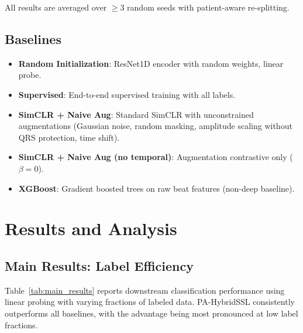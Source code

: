 \documentclass[journal,10pt]{IEEEtran}
\newcommand{\method}{PA-HybridSSL}
\newcommand{\tabref}[1]{Table~\ref{#1}}
\begin{document}
All results are averaged over $\geq$3 random seeds with patient-aware re-splitting.

\subsection{Baselines}

\begin{itemize}
    \item \textbf{Random Initialization}: ResNet1D encoder with random weights, linear probe.
    \item \textbf{Supervised}: End-to-end supervised training with all labels.
    \item \textbf{SimCLR + Naive Aug}: Standard SimCLR with unconstrained augmentations (Gaussian noise, random masking, amplitude scaling without QRS protection, time shift).
    \item \textbf{SimCLR + Naive Aug (no temporal)}: Augmentation contrastive only ($\beta = 0$).
    \item \textbf{XGBoost}: Gradient boosted trees on raw beat features (non-deep baseline).
\end{itemize}



\section{Results and Analysis}
\label{sec:results}

\subsection{Main Results: Label Efficiency}

\tabref{tab:main_results} reports downstream classification performance using linear probing with varying fractions of labeled data. \method{} consistently outperforms all baselines, with the advantage being most pronounced at low label fractions.
\end{document}
